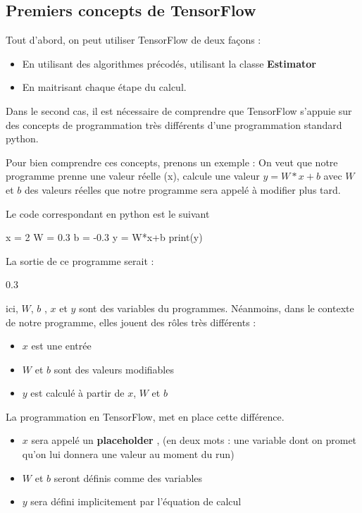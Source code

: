 \documentclass[a4paper,11pt]{book}
\begin{document}
\subsection{Premiers concepts de TensorFlow}

Tout d'abord, on peut utiliser TensorFlow de deux façons :
\begin{itemize}
\item En utilisant des algorithmes précodés, utilisant la classe \textbf{Estimator}
\item En maitrisant chaque étape du calcul.
\end{itemize}

Dans le second cas, il est nécessaire de comprendre que TensorFlow
s'appuie sur des concepts de programmation très différents d'une programmation standard python.

Pour bien comprendre ces concepts, prenons un exemple :
On veut que notre programme prenne une valeur réelle (x), calcule une valeur  $y = W*x+b$ avec $W$ et $b$ des valeurs réelles que notre programme sera appelé à modifier plus tard.

Le code correspondant en python est le suivant
\begin{mypython}
x = 2
W = 0.3
b = -0.3
y = W*x+b
print(y)
\end{mypython}

La sortie de ce programme serait :
\begin{myoutput}
0.3
\end{myoutput}

ici, $W$, $b$ , $x$ et $y$ sont des variables du programmes.
Néanmoins, dans le contexte de notre programme, elles jouent des rôles très différents :
\begin{itemize}
\item $x$ est une entrée 
\item $W$ et $b$ sont des valeurs modifiables
\item $y$ est calculé à partir de $x$, $W$ et $b$
\end{itemize}

La programmation en TensorFlow, met en place cette différence.
\begin{itemize}
\item $x$ sera appelé un \textbf{placeholder} , (en deux mots : une variable dont on promet qu'on lui donnera une valeur au moment du run)
\item $W$ et $b$ seront définis comme des variables
\item $y$ sera défini implicitement par l'équation de calcul 
\end{itemize}
\end{document}
